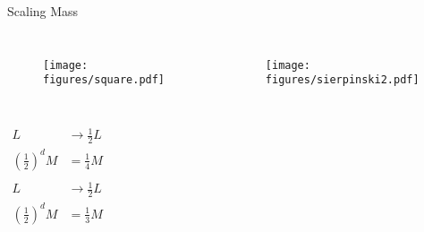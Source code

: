\documentclass[10pt]{beamer}
\begin{document}
\begin{frame}{Scaling Mass}
    \begin{columns}[c]
        \column{1.5in}
        \begin{figure}[h!]
            \centering
            \texttt{[image: figures/square.pdf]}
        \end{figure}
    \column{1.5in}
        \begin{figure}[h!]
            \centering
            \texttt{[image: figures/sierpinski2.pdf]}
        \end{figure}
    \end{columns}
    \begin{columns}[c]
        \column{1.5in}
            \begin{align*}
                L &\rightarrow \frac{1}{2} L \\
                \left (\frac{1}{2} \right )^d M &= \frac{1}{4} M \\
            \end{align*}
        \column{1.5in}
            \begin{align*}
                L &\rightarrow \frac{1}{2} L \\
                \left (\frac{1}{2} \right )^d M &= \frac{1}{3} M \\
            \end{align*}
    \end{columns}
\end{frame}
\end{document}
